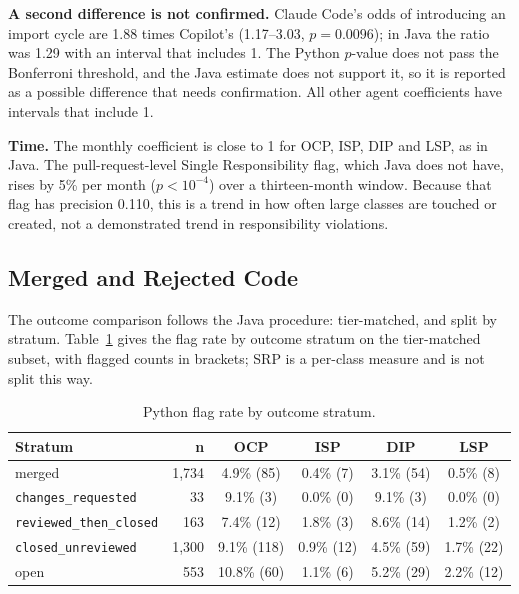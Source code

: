\textbf{A second difference is not confirmed.} Claude Code's odds of introducing an import cycle are
1.88 times Copilot's (1.17--3.03, $p = 0.0096$); in Java the ratio was 1.29 with an interval that
includes 1. The Python $p$-value does not pass the Bonferroni threshold, and the Java estimate does
not support it, so it is reported as a possible difference that needs confirmation. All other agent
coefficients have intervals that include 1.

\textbf{Time.} The monthly coefficient is close to 1 for OCP, ISP, DIP and LSP, as in Java. The
pull-request-level Single Responsibility flag, which Java does not have, rises by 5\% per month
($p < 10^{-4}$) over a thirteen-month window. Because that flag has precision 0.110, this is a trend
in how often large classes are touched or created, not a demonstrated trend in responsibility
violations.

\subsection{Merged and Rejected Code}
\label{sec:python-outcome}

The outcome comparison follows the Java procedure: tier-matched, and split by stratum.
Table~\ref{tab:py-outcome} gives the flag rate by outcome stratum on the tier-matched subset, with
flagged counts in brackets; SRP is a per-class measure and is not split this way.

\begin{table}[htb]
\centering
\caption{Python flag rate by outcome stratum.}
\label{tab:py-outcome}
\begin{tabular}{@{}lrcccc@{}}
\toprule
\textbf{Stratum} & \textbf{n} & \textbf{OCP} & \textbf{ISP} & \textbf{DIP} & \textbf{LSP} \\
\midrule
merged & 1{,}734 & 4.9\% (85) & 0.4\% (7) & 3.1\% (54) & 0.5\% (8) \\
\midrule
\texttt{changes\_requested} & 33 & 9.1\% (3) & 0.0\% (0) & 9.1\% (3) & 0.0\% (0) \\
\texttt{reviewed\_then\_closed} & 163 & 7.4\% (12) & 1.8\% (3) & 8.6\% (14) & 1.2\% (2) \\
\texttt{closed\_unreviewed} & 1{,}300 & 9.1\% (118) & 0.9\% (12) & 4.5\% (59) & 1.7\% (22) \\
\midrule
open & 553 & 10.8\% (60) & 1.1\% (6) & 5.2\% (29) & 2.2\% (12) \\
\bottomrule
\end{tabular}
\end{table}


